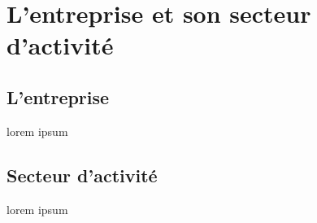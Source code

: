 \chapter{L'entreprise et son secteur d'activité}
\label{chap:premierchapitre}

\section{L'entreprise}

lorem ipsum

\section{Secteur d'activité}

lorem ipsum




